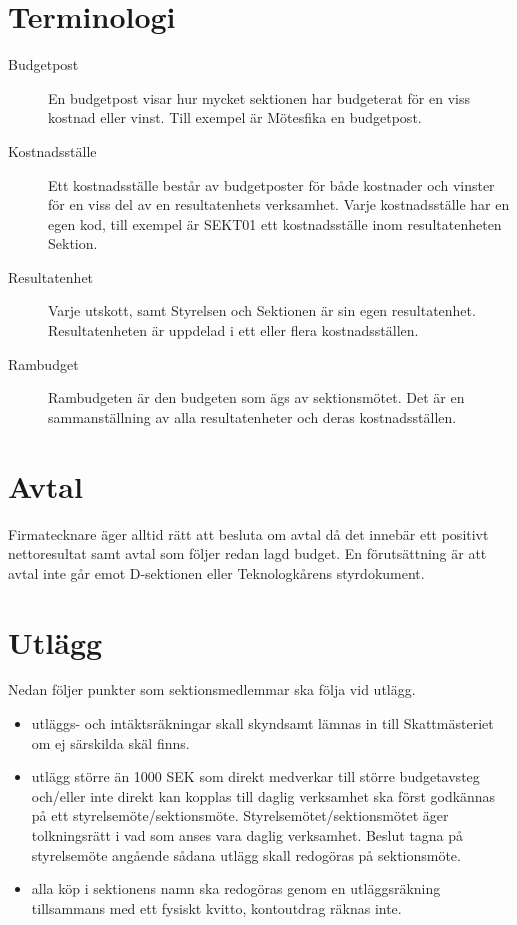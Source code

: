 \documentclass{dsekprotokoll}
\begin{document}
\section{Terminologi}
\begin{description}
\item[Budgetpost] En budgetpost visar hur mycket sektionen har budgeterat för en viss kostnad eller vinst. Till exempel är Mötesfika en budgetpost.
\item[Kostnadsställe] Ett kostnadsställe består av budgetposter för både kostnader och vinster för en viss del av en resultatenhets verksamhet. Varje kostnadsställe har en egen kod, till exempel är SEKT01 ett kostnadsställe inom resultatenheten Sektion.
\item[Resultatenhet] Varje utskott, samt Styrelsen och Sektionen är sin egen resultatenhet. Resultatenheten är uppdelad i ett eller flera kostnadsställen.
\item[Rambudget] Rambudgeten är den budgeten som ägs av sektionsmötet. Det är en sammanställning av alla resultatenheter och deras kostnadsställen. 
\end{description}

\section{Avtal}
Firmatecknare äger alltid rätt att besluta om avtal då det innebär ett
positivt nettoresultat samt avtal som följer redan lagd budget. En förutsättning är att avtal
inte går emot D-sektionen eller Teknologkårens styrdokument.

\section{Utlägg}
Nedan följer punkter som sektionsmedlemmar ska följa vid utlägg.

\begin{itemize}
    \item utläggs- och intäktsräkningar skall skyndsamt lämnas in till Skattmästeriet om ej särskilda skäl finns.

    \item utlägg större än 1000 SEK som direkt medverkar till större budgetavsteg och/eller inte direkt kan kopplas till daglig verksamhet ska först godkännas på ett styrelsemöte/sektionsmöte. Styrelsemötet/sektionsmötet äger tolkningsrätt i vad som anses vara daglig verksamhet. Beslut tagna på styrelsemöte angående sådana utlägg skall redogöras på sektionsmöte.

    \item alla köp i sektionens namn ska redogöras genom en utläggsräkning tillsammans med ett fysiskt kvitto, kontoutdrag räknas inte.
\end{itemize}
\end{document}

